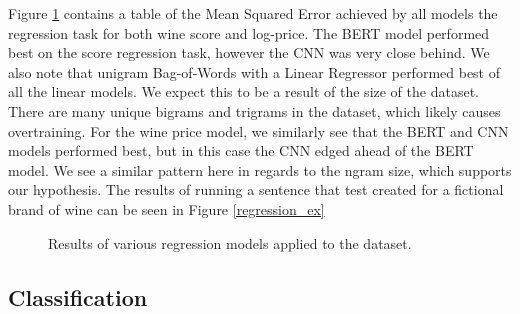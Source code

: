 \documentclass[12pt]{IEEEtran}
\begin{document}
    Figure \ref{regression_results} contains a table of the Mean Squared Error achieved by all models the regression task for both wine score and log-price. The BERT model performed best on the score regression task, however the CNN was very close behind. We also note that unigram Bag-of-Words with a Linear Regressor performed best of all the linear models. We expect this to be a result of the size of the dataset. There are many unique bigrams and trigrams in the dataset, which likely causes overtraining. For the wine price model, we similarly see that the BERT and CNN models performed best, but in this case the CNN edged ahead of the BERT model. We see a similar pattern here in regards to the ngram size, which supports our hypothesis. The results of running a sentence that test created for a fictional brand of wine can be seen in Figure \ref{regression_ex}
\begin{figure}[H]
    \centering
    \caption{ Results of various regression models applied to the dataset. }
    \label{regression_results}
\end{figure}
    

\subsection{Classification}
\end{document}
